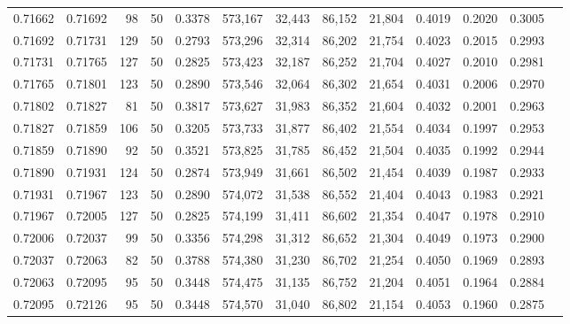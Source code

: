 \begin{tabular}{rrrrrrrrrrrrr}
0.71662 & 0.71692 &    98 &  50 &                                     0.3378 & 573,167 &  32,443 &  86,152 &  21,804 & 0.4019 & 0.2020 & 0.3005 \\
0.71692 & 0.71731 &   129 &  50 &                                     0.2793 & 573,296 &  32,314 &  86,202 &  21,754 & 0.4023 & 0.2015 & 0.2993 \\
0.71731 & 0.71765 &   127 &  50 &                                     0.2825 & 573,423 &  32,187 &  86,252 &  21,704 & 0.4027 & 0.2010 & 0.2981 \\
0.71765 & 0.71801 &   123 &  50 &                                     0.2890 & 573,546 &  32,064 &  86,302 &  21,654 & 0.4031 & 0.2006 & 0.2970 \\
0.71802 & 0.71827 &    81 &  50 &                                     0.3817 & 573,627 &  31,983 &  86,352 &  21,604 & 0.4032 & 0.2001 & 0.2963 \\
0.71827 & 0.71859 &   106 &  50 &                                     0.3205 & 573,733 &  31,877 &  86,402 &  21,554 & 0.4034 & 0.1997 & 0.2953 \\
0.71859 & 0.71890 &    92 &  50 &                                     0.3521 & 573,825 &  31,785 &  86,452 &  21,504 & 0.4035 & 0.1992 & 0.2944 \\
0.71890 & 0.71931 &   124 &  50 &                                     0.2874 & 573,949 &  31,661 &  86,502 &  21,454 & 0.4039 & 0.1987 & 0.2933 \\
0.71931 & 0.71967 &   123 &  50 &                                     0.2890 & 574,072 &  31,538 &  86,552 &  21,404 & 0.4043 & 0.1983 & 0.2921 \\
0.71967 & 0.72005 &   127 &  50 &                                     0.2825 & 574,199 &  31,411 &  86,602 &  21,354 & 0.4047 & 0.1978 & 0.2910 \\
0.72006 & 0.72037 &    99 &  50 &                                     0.3356 & 574,298 &  31,312 &  86,652 &  21,304 & 0.4049 & 0.1973 & 0.2900 \\
0.72037 & 0.72063 &    82 &  50 &                                     0.3788 & 574,380 &  31,230 &  86,702 &  21,254 & 0.4050 & 0.1969 & 0.2893 \\
0.72063 & 0.72095 &    95 &  50 &                                     0.3448 & 574,475 &  31,135 &  86,752 &  21,204 & 0.4051 & 0.1964 & 0.2884 \\
0.72095 & 0.72126 &    95 &  50 &                                     0.3448 & 574,570 &  31,040 &  86,802 &  21,154 & 0.4053 & 0.1960 & 0.2875 \\

\end{tabular}
